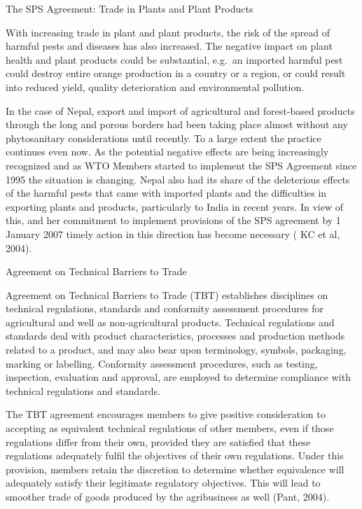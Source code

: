 \documentclass[
]{book}
\begin{document}
The SPS Agreement: Trade in Plants and Plant Products

With increasing trade in plant and plant products, the risk of the spread of harmful pests and diseases has also increased. The negative impact on plant health and plant products could be substantial, e.g.~an imported harmful pest could destroy entire orange production in a country or a region, or could result into reduced yield, quality deterioration and environmental pollution.

In the case of Nepal, export and import of agricultural and forest-based products through the long and porous borders had been taking place almost without any phytosanitary considerations until recently. To a large extent the practice continues even now. As the potential negative effects are being increasingly recognized and as WTO Members started to implement the SPS Agreement since 1995 the situation is changing. Nepal also had its share of the deleterious effects of the harmful pests that came with imported plants and the difficulties in exporting plants and products, particularly to India in recent years. In view of this, and her commitment to implement provisions of the SPS agreement by 1 January 2007 timely action in this direction has become necessary ( KC et al, 2004).

Agreement on Technical Barriers to Trade

Agreement on Technical Barriers to Trade (TBT) establishes disciplines on technical regulations, standards and conformity assessment procedures for agricultural and well as non-agricultural products. Technical regulations and standards deal with product characteristics, processes and production methods related to a product, and may also bear upon terminology, symbols, packaging, marking or labelling. Conformity assessment procedures, such as testing, inspection, evaluation and approval, are employed to determine compliance with technical regulations and standards.

The TBT agreement encourages members to give positive consideration to accepting as equivalent technical regulations of other members, even if those regulations differ from their own, provided they are satisfied that these regulations adequately fulfil the objectives of their own regulations. Under this provision, members retain the discretion to determine whether equivalence will adequately satisfy their legitimate regulatory objectives. This will lead to smoother trade of goods produced by the agribusiness as well (Pant, 2004).
\end{document}
